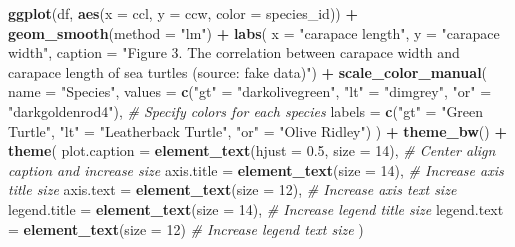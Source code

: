 \documentclass[
]{article}
\newenvironment{Shaded}{\begin{snugshade}}{\end{snugshade}}
\newcommand{\AttributeTok}[1]{\textcolor[rgb]{0.13,0.29,0.53}{#1}}
\newcommand{\CommentTok}[1]{\textcolor[rgb]{0.56,0.35,0.01}{\textit{#1}}}
\newcommand{\DecValTok}[1]{\textcolor[rgb]{0.00,0.00,0.81}{#1}}
\newcommand{\FloatTok}[1]{\textcolor[rgb]{0.00,0.00,0.81}{#1}}
\newcommand{\FunctionTok}[1]{\textcolor[rgb]{0.13,0.29,0.53}{\textbf{#1}}}
\newcommand{\NormalTok}[1]{#1}
\newcommand{\OtherTok}[1]{\textcolor[rgb]{0.56,0.35,0.01}{#1}}
\newcommand{\SpecialCharTok}[1]{\textcolor[rgb]{0.81,0.36,0.00}{\textbf{#1}}}
\newcommand{\StringTok}[1]{\textcolor[rgb]{0.31,0.60,0.02}{#1}}
\begin{document}
\begin{Shaded}
\begin{Highlighting}[]
\FunctionTok{ggplot}\NormalTok{(df, }\FunctionTok{aes}\NormalTok{(}\AttributeTok{x =}\NormalTok{ ccl, }\AttributeTok{y =}\NormalTok{ ccw, }\AttributeTok{color =}\NormalTok{ species\_id)) }\SpecialCharTok{+}
  \FunctionTok{geom\_smooth}\NormalTok{(}\AttributeTok{method =} \StringTok{"lm"}\NormalTok{) }\SpecialCharTok{+}
  \FunctionTok{labs}\NormalTok{( }\AttributeTok{x =} \StringTok{"carapace length"}\NormalTok{,}
        \AttributeTok{y =} \StringTok{"carapace width"}\NormalTok{,}
        \AttributeTok{caption =} \StringTok{"Figure 3. The correlation between carapace width and carapace length of sea turtles (source: fake data)"}\NormalTok{) }\SpecialCharTok{+}
  \FunctionTok{scale\_color\_manual}\NormalTok{(}
    \AttributeTok{name =} \StringTok{"Species"}\NormalTok{,}
    \AttributeTok{values =} \FunctionTok{c}\NormalTok{(}\StringTok{"gt"} \OtherTok{=} \StringTok{"darkolivegreen"}\NormalTok{, }\StringTok{"lt"} \OtherTok{=} \StringTok{"dimgrey"}\NormalTok{, }\StringTok{"or"} \OtherTok{=} \StringTok{"darkgoldenrod4"}\NormalTok{),  }\CommentTok{\# Specify colors for each species}
    \AttributeTok{labels =} \FunctionTok{c}\NormalTok{(}\StringTok{"gt"} \OtherTok{=} \StringTok{"Green Turtle"}\NormalTok{, }\StringTok{"lt"} \OtherTok{=} \StringTok{"Leatherback Turtle"}\NormalTok{, }\StringTok{"or"} \OtherTok{=} \StringTok{"Olive Ridley"}\NormalTok{)}
\NormalTok{  ) }\SpecialCharTok{+}
  \FunctionTok{theme\_bw}\NormalTok{() }\SpecialCharTok{+}
  \FunctionTok{theme}\NormalTok{(}
    \AttributeTok{plot.caption =} \FunctionTok{element\_text}\NormalTok{(}\AttributeTok{hjust =} \FloatTok{0.5}\NormalTok{, }\AttributeTok{size =} \DecValTok{14}\NormalTok{),  }\CommentTok{\# Center align caption and increase size}
    \AttributeTok{axis.title =} \FunctionTok{element\_text}\NormalTok{(}\AttributeTok{size =} \DecValTok{14}\NormalTok{),  }\CommentTok{\# Increase axis title size}
    \AttributeTok{axis.text =} \FunctionTok{element\_text}\NormalTok{(}\AttributeTok{size =} \DecValTok{12}\NormalTok{),   }\CommentTok{\# Increase axis text size}
    \AttributeTok{legend.title =} \FunctionTok{element\_text}\NormalTok{(}\AttributeTok{size =} \DecValTok{14}\NormalTok{), }\CommentTok{\# Increase legend title size}
    \AttributeTok{legend.text =} \FunctionTok{element\_text}\NormalTok{(}\AttributeTok{size =} \DecValTok{12}\NormalTok{)   }\CommentTok{\# Increase legend text size}
\NormalTok{)}
\end{Highlighting}
\end{Shaded}
\end{document}
